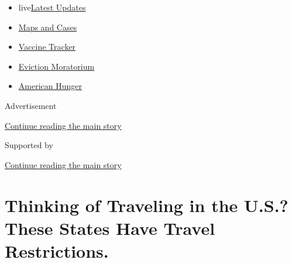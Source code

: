 \begin{itemize}
\tightlist
\item
  live\href{https://www.nytimes3xbfgragh.onion/2020/09/08/world/covid-19-coronavirus.html?name=styln-coronavirus-national\&region=TOP_BANNER\&block=storyline_menu_recirc\&action=click\&pgtype=Article\&impression_id=43485f21-f1c1-11ea-b492-3b10163695e2\&variant=undefined}{Latest
  Updates}
\item
  \href{https://www.nytimes3xbfgragh.onion/interactive/2020/us/coronavirus-us-cases.html?name=styln-coronavirus-national\&region=TOP_BANNER\&block=storyline_menu_recirc\&action=click\&pgtype=Article\&impression_id=43492270-f1c1-11ea-b492-3b10163695e2\&variant=undefined}{Maps
  and Cases}
\item
  \href{https://www.nytimes3xbfgragh.onion/interactive/2020/science/coronavirus-vaccine-tracker.html?name=styln-coronavirus-national\&region=TOP_BANNER\&block=storyline_menu_recirc\&action=click\&pgtype=Article\&impression_id=43492271-f1c1-11ea-b492-3b10163695e2\&variant=undefined}{Vaccine
  Tracker}
\item
  \href{https://www.nytimes3xbfgragh.onion/2020/09/02/your-money/eviction-moratorium-covid.html?name=styln-coronavirus-national\&region=TOP_BANNER\&block=storyline_menu_recirc\&action=click\&pgtype=Article\&impression_id=43492272-f1c1-11ea-b492-3b10163695e2\&variant=undefined}{Eviction
  Moratorium}
\item
  \href{https://www.nytimes3xbfgragh.onion/interactive/2020/09/02/magazine/food-insecurity-hunger-us.html?name=styln-coronavirus-national\&region=TOP_BANNER\&block=storyline_menu_recirc\&action=click\&pgtype=Article\&impression_id=43492273-f1c1-11ea-b492-3b10163695e2\&variant=undefined}{American
  Hunger}
\end{itemize}

Advertisement

\protect\hyperlink{after-top}{Continue reading the main story}

Supported by

\protect\hyperlink{after-sponsor}{Continue reading the main story}

\hypertarget{thinking-of-traveling-in-the-us-these-states-have-travel-restrictions}{%
\section{Thinking of Traveling in the U.S.? These States Have Travel
Restrictions.}\label{thinking-of-traveling-in-the-us-these-states-have-travel-restrictions}}

